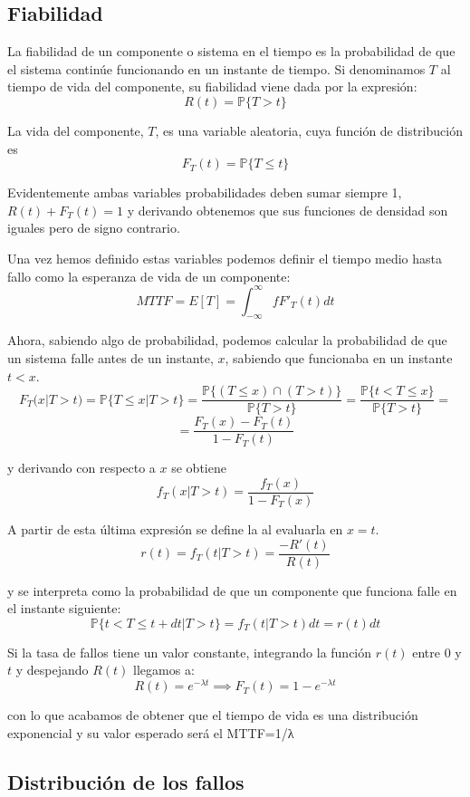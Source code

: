 \documentclass{apuntes}[nochap]
\begin{document}
\subsection{Fiabilidad}

La fiabilidad de un componente o sistema en el tiempo es la probabilidad de que el sistema continúe funcionando en un instante de tiempo. Si denominamos $T$ al tiempo de vida del componente, su fiabilidad viene dada por la expresión:
\[R(t)=\mathbb{P}\{T > t \}\]

La vida del componente, $T$, es una variable aleatoria, cuya función de distribución es
\[F_T(t)=\mathbb{P}\{T \leq t \}\]

Evidentemente ambas variables probabilidades deben sumar siempre 1, $R(t)+F_T(t)=1$ y derivando obtenemos que sus funciones de densidad son iguales pero de signo contrario.

Una vez hemos definido estas variables podemos definir el tiempo medio hasta fallo como la esperanza de vida de un componente:
\[MTTF = E[T]=\int_{-\infty}^{\infty}fF'_T(t)dt\]

Ahora, sabiendo algo de probabilidad, podemos calcular la probabilidad de que un sistema falle antes de un instante, $x$, sabiendo que funcionaba en un instante $t<x$.
\[F_T(x | T > t ) = \mathbb{P}\{T \leq x | T> t\}=\frac{\mathbb{P}\{(T \leq x) \cap (T > t)\}}{\mathbb{P}\{T > t\}}=\frac{\mathbb{P}\{t < T \leq x\}}{\mathbb{P}\{T > t\}}=\]
\[=\frac{F_T(x)-F_T(t)}{1-F_T(t)}\]

y derivando con respecto a $x$ se obtiene
\[f_T(x | T > t)=\frac{f_T(x)}{1-F_T(x)}\]

A partir de esta última expresión se define la  al evaluarla en $x=t$.
\[r(t)=f_T(t | T > t)=\frac{-R'(t)}{R(t)}\]

y se interpreta como la probabilidad de que un componente que funciona falle en el instante siguiente:
\[\mathbb{P}\{t<T\leq t + dt | T > t\}=f_T(t | T > t)dt=r(t)dt\]

Si la tasa de fallos tiene un valor constante, integrando la función $r(t)$ entre $0$ y $t$ y despejando $R(t)$ llegamos a:
\[R(t)=e^{-λt} \implies F_T(t) = 1-e^{-λt}\]

con lo que acabamos de obtener que el tiempo de vida es una distribución exponencial y su valor esperado será el MTTF=1/λ

\subsection{Distribución de los fallos}
\end{document}

